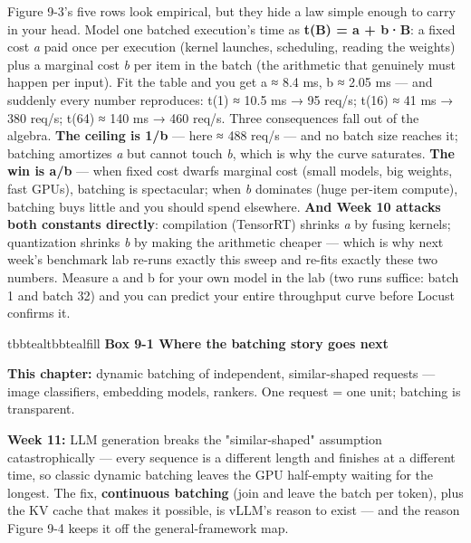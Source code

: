 Figure 9-3's five rows look empirical, but they hide a law simple enough to carry in your head. Model one batched execution's time as \textbf{t(B) = a + b·B}: a fixed cost \textit{a} paid once per execution (kernel launches, scheduling, reading the weights) plus a marginal cost \textit{b} per item in the batch (the arithmetic that genuinely must happen per input). Fit the table and you get a ≈ 8.4 ms, b ≈ 2.05 ms — and suddenly every number reproduces: t(1) ≈ 10.5 ms → 95 req/s; t(16) ≈ 41 ms → 380 req/s; t(64) ≈ 140 ms → 460 req/s. Three consequences fall out of the algebra. \textbf{The ceiling is 1/b} — here ≈ 488 req/s — and no batch size reaches it; batching amortizes \textit{a} but cannot touch \textit{b}, which is why the curve saturates. \textbf{The win is a/b} — when fixed cost dwarfs marginal cost (small models, big weights, fast GPUs), batching is spectacular; when \textit{b} dominates (huge per-item compute), batching buys little and you should spend elsewhere. \textbf{And Week 10 attacks both constants directly}: compilation (TensorRT) shrinks \textit{a} by fusing kernels; quantization shrinks \textit{b} by making the arithmetic cheaper — which is why next week's benchmark lab re-runs exactly this sweep and re-fits exactly these two numbers. Measure a and b for your own model in the lab (two runs suffice: batch 1 and batch 32) and you can predict your entire throughput curve before Locust confirms it.

\begin{calloutbox}{tbbteal}{tbbtealfill}
{\normalsize\bfseries\color{tbbx115E59}Box 9-1  Where the batching story goes next}\par\vspace{3pt}
\textbf{This chapter:} dynamic batching of independent, similar-shaped requests — image classifiers, embedding models, rankers. One request = one unit; batching is transparent.

\textbf{Week 11:} LLM generation breaks the "similar-shaped" assumption catastrophically — every sequence is a different length and finishes at a different time, so classic dynamic batching leaves the GPU half-empty waiting for the longest. The fix, \textbf{continuous batching} (join and leave the batch per token), plus the KV cache that makes it possible, is vLLM's reason to exist — and the reason Figure 9-4 keeps it off the general-framework map.
\end{calloutbox}

\vspace{3.0pt}

